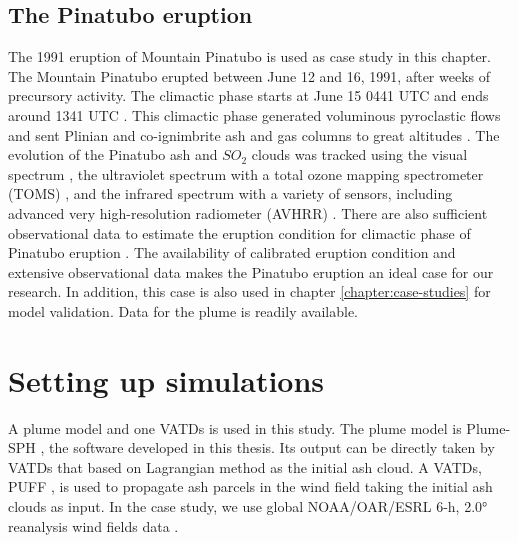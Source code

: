 \subsection{The Pinatubo eruption}

The 1991 eruption of Mountain Pinatubo is used as case study in this chapter. The Mountain Pinatubo erupted between June 12 and 16, 1991, after weeks of precursory activity. The climactic phase starts at June 15 0441 UTC and ends around 1341 UTC \citep{holasek1996satellite}. This climactic phase generated voluminous pyroclastic flows and sent Plinian and co-ignimbrite ash and gas columns to great altitudes \citep{scott1996pyroclastic}. The evolution of the Pinatubo ash and $SO_2$ clouds was tracked using the visual spectrum \citep{holasek1996satellite}, the ultraviolet spectrum with a total ozone mapping spectrometer (TOMS) \citep{guo2004re}, and the infrared spectrum with a variety of sensors, including advanced very high-resolution radiometer (AVHRR) \citep{guo2004particles}. There are also sufficient observational data to estimate the eruption condition for climactic phase of Pinatubo eruption \citep{suzuki2009three}. The availability of calibrated eruption condition and extensive observational data makes the Pinatubo eruption an ideal case for our research. In addition, this case is also used in chapter \ref{chapter:case-studies} for model validation. Data for the plume is readily available.

\section{Setting up simulations} \label{sec:Methodology}

A plume model and one VATDs is used in this study.
The plume model is Plume-SPH \citep{gmd-2017-119}, the software developed in this thesis. Its output can be directly taken by VATDs that based on Lagrangian method as the initial ash cloud. A VATDs, PUFF \citep{tanaka1991development,searcy1998puff}, is used to propagate ash parcels in the wind field taking the initial ash clouds as input. In the case study, we use global NOAA/OAR/ESRL 6-h, 2.0° reanalysis wind fields data \citep{whitaker2004reanalysis, compo2006feasibility, compo2011twentieth}.

